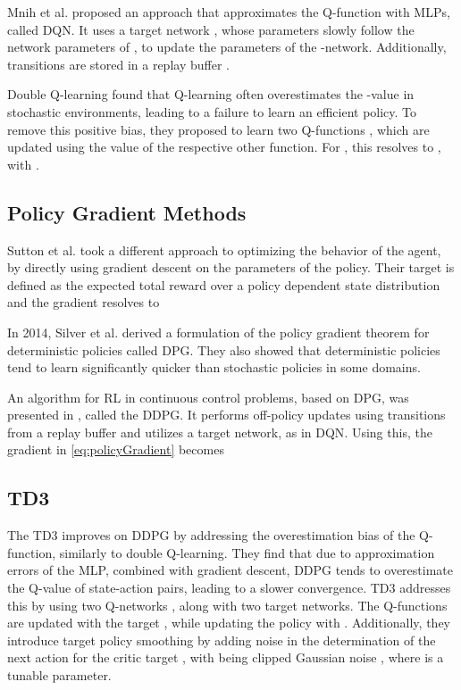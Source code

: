 \documentclass{article}
\begin{document}
Mnih et al. \cite{Mnih2015} proposed an approach that approximates the Q-function with \glspl*{MLP}, called \gls*{DQN}. It uses a target network , whose parameters  slowly follow the network parameters of , to update the parameters of the -network.
Additionally, transitions  are stored in a replay buffer .

Double Q-learning \cite{VanHasselt2010} found that Q-learning often overestimates the -value in stochastic environments, leading to a failure to learn an efficient policy.
To remove this positive bias, they proposed to learn two Q-functions , which are updated using the value of the respective other function. For , this resolves to , with . 

\subsection{Policy Gradient Methods}

Sutton et al. \cite{Sutton1999Gradient} took a different approach to optimizing the behavior of the agent, by directly using gradient descent on the parameters of the policy.
Their target  is defined as the expected total reward over a policy dependent state distribution  and the gradient resolves to


In 2014, Silver et al. \cite{Silver2014} derived a formulation of the policy gradient theorem for deterministic policies  called \gls*{DPG}. They also showed that deterministic policies tend to learn significantly quicker than stochastic policies in some domains.

An algorithm for \gls*{RL} in continuous control problems, based on \gls*{DPG}, was presented in \cite{Lillicrap2016}, called the \gls*{DDPG}. It performs off-policy updates using transitions from a replay buffer  and utilizes a target network, as in \gls*{DQN}.
Using this, the gradient in \eqref{eq:policyGradient} becomes

\subsection{TD3}
The \gls*{TD3} \cite{Fujimoto2018}  improves on \gls*{DDPG} by addressing the overestimation bias of the Q-function, similarly to double Q-learning.
They find that due to approximation errors of the \gls*{MLP}, combined with gradient descent, \gls*{DDPG} tends to overestimate the Q-value of state-action pairs, leading to a slower convergence.
\gls*{TD3} addresses this by using two Q-networks , along with two target networks. 
The Q-functions are updated with the target , while updating the policy with .
Additionally, they introduce target policy smoothing by adding noise in the determination of the next action for the critic target , with  being clipped Gaussian noise , where  is a tunable parameter.
\end{document}
